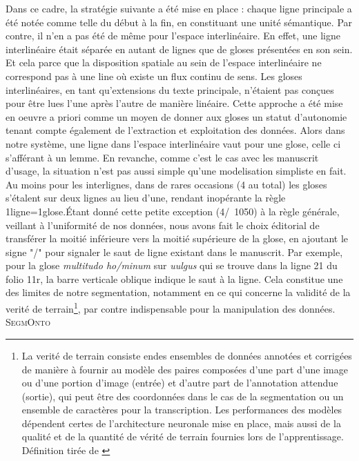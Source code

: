\documentclass[a4paper, twoside, 12pt]{book}
\begin{document}
Dans ce cadre, la stratégie suivante a été mise en place : chaque ligne principale a été notée comme telle du début à la fin, en constituant une unité sémantique. Par contre, il n'en a pas été de même pour l'espace interlinéaire. En effet, une ligne interlinéaire était séparée en autant de lignes que de gloses présentées en son sein. Et cela parce que la disposition spatiale au sein de l'espace interlinéaire ne correspond pas à une line où existe un flux continu de sens. Les gloses interlinéaires, en tant qu'extensions du texte principale, n'étaient pas conçues pour être lues l'une après l'autre de manière linéaire. Cette approche a été mise en oeuvre a priori comme un moyen de donner aux gloses un statut d'autonomie tenant compte également de l'extraction et exploitation des données. Alors dans notre système, une ligne dans l'espace interlinéaire vaut pour une glose, celle ci s'afférant à un lemme. En revanche, comme c'est le cas avec les manuscrit d'usage, la situation n'est pas aussi simple qu'une modelisation simpliste en fait. Au moins pour les interlignes, dans de rares occasions (4 au total) les gloses s'étalent sur deux lignes au lieu d'une, rendant inopérante la règle 1ligne=1glose.Étant donné cette petite exception (4/~1050) à la règle générale, veillant à l'uniformité de nos données, nous avons fait le choix éditorial de transférer la moitié inférieure vers la moitié supérieure de la glose, en ajoutant le signe "/" pour signaler le saut de ligne existant dans le manuscrit. Par exemple, pour la glose \textit{multitudo ho/minum} sur \textit{uulgus} qui se trouve dans la ligne 21 du folio 11r, la barre verticale oblique indique le saut à la ligne. Cela constitue une des limites de notre segmentation, notamment en ce qui concerne la validité de la verité de terrain\footnote{ La verité de terrain consiste en\og{}des ensembles de données annotées et corrigées de manière à fournir au modèle des paires composées d'une part d'une image ou d'une portion d'image (entrée) et d'autre part de l’annotation attendue (sortie), qui peut être des coordonnées dans le cas de la segmentation ou un ensemble de caractères pour la transcription. Les performances des modèles dépendent certes de l'architecture neuronale mise en place, mais aussi de la qualité et de la quantité de vérité de terrain fournies lors de l'apprentissage.\fg{} Définition tirée de \cite{chague2021htr}}, par contre indispensable pour la manipulation des données. \\

\textsc{SegmOnto}
\end{document}
